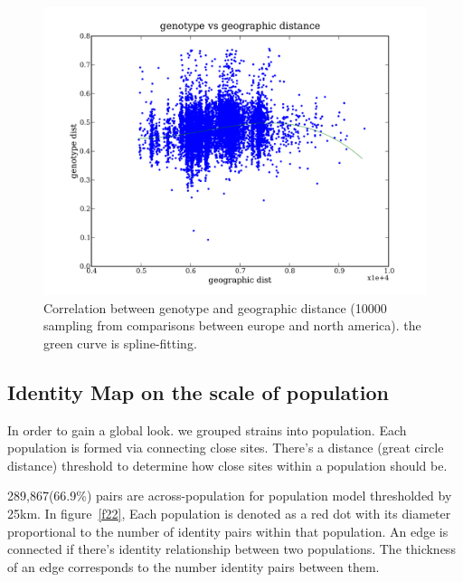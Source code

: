 \documentclass[a4paper,10pt]{article}
\begin{document}
\begin{figure}
\includegraphics[width=1\textwidth]{figures/data_d110_c0_5_geno_vs_geo_dist_eur_noramer.png}
\caption{Correlation between genotype and geographic distance (10000 sampling from comparisons between europe and north america). the green curve is spline-fitting.}\label{fggd_5}
\end{figure}


\subsection{Identity Map on the scale of population}
In order to gain a global look. we grouped strains into population. Each population is formed via connecting close sites. There's a distance (great circle distance) threshold to determine how close sites within a population should be.

289,867(66.9\%) pairs are across-population for population model thresholded by 25km. In figure~\ref{f22}, Each population is denoted as a red dot with its diameter proportional to the number of identity pairs within that population. An edge is connected if there's identity relationship between two populations. The thickness of an edge corresponds to the number identity pairs between them.
\end{document}
